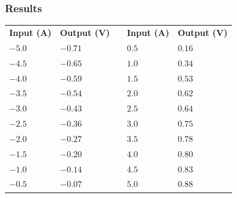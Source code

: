 \subsubsection{Results}

\begin{table}[H]
\begin{tabular}{|l|l|l| l|l|}
\cline{1-2}\cline{4-5}%
  \textbf{Input (A)}   & \textbf{Output (V)} &\phantom{hey}& \textbf{Input (A)}   & \textbf{Output (V)}\\
\cline{1-2}\cline{4-5}%
  $-5.0$               &            $-0.71$  && $0.5$                & $0.16$             \\
\cline{1-2}\cline{4-5}%
  $-4.5$               &            $-0.65$  && $1.0$                & $0.34$             \\
\cline{1-2}\cline{4-5}%
  $-4.0$               &            $-0.59$  && $1.5$                & $0.53$             \\
\cline{1-2}\cline{4-5}%
  $-3.5$               &            $-0.54$  && $2.0$                & $0.62$             \\
\cline{1-2}\cline{4-5}%
  $-3.0$               &            $-0.43$  && $2.5$                & $0.64$             \\
\cline{1-2}\cline{4-5}%
  $-2.5$               &            $-0.36$  && $3.0$                & $0.75$             \\
\cline{1-2}\cline{4-5}%
  $-2.0$               &            $-0.27$  && $3.5$                & $0.78$             \\
\cline{1-2}\cline{4-5}%
  $-1.5$               &            $-0.20$  && $4.0$                & $0.80$             \\
\cline{1-2}\cline{4-5}%
  $-1.0$               &            $-0.14$  && $4.5$                & $0.83$             \\
\cline{1-2}\cline{4-5}%
  $-0.5$               &            $-0.07$  && $5.0$                & $0.88$             \\
\cline{1-2}\cline{4-5}%
\end{tabular}
\end{table}
